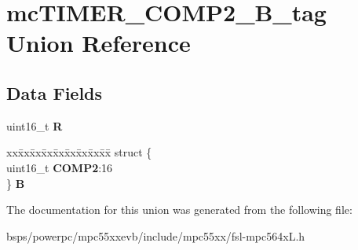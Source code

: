 \hypertarget{unionmcTIMER__COMP2__16B__tag}{}\section{mc\+T\+I\+M\+E\+R\+\_\+\+C\+O\+M\+P2\+\_\+B\+\_\+tag Union Reference}
\label{unionmcTIMER__COMP2__16B__tag}
\subsection*{Data Fields}
\begin{DoxyCompactItemize}
\item 
\mbox{\label{unionmcTIMER__COMP2__16B__tag_a091c481f853d0c0073ce03c3df29eba4}} 
uint16\+\_\+t {\bfseries R}
\item 
\mbox{\label{unionmcTIMER__COMP2__16B__tag_ac038ecd48c5af9d23218ddeac5b4289d}} 
\begin{tabbing}
xx\=xx\=xx\=xx\=xx\=xx\=xx\=xx\=xx\=\kill
struct \{\\
\>uint16\_t {\bfseries COMP2}:16\\
\} {\bfseries B}\\

\end{tabbing}\end{DoxyCompactItemize}


The documentation for this union was generated from the following file\+:\begin{DoxyCompactItemize}
\item 
bsps/powerpc/mpc55xxevb/include/mpc55xx/fsl-\/mpc564x\+L.\+h\end{DoxyCompactItemize}

